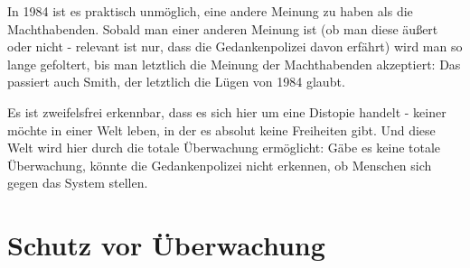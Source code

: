 \documentclass{article}
\begin{document}
In 1984 ist es praktisch unmöglich, eine andere Meinung zu haben als die Machthabenden. Sobald man einer anderen Meinung ist (ob man diese äußert oder nicht - relevant ist nur, dass die Gedankenpolizei davon erfährt) wird man so lange gefoltert, bis man letztlich die Meinung der Machthabenden akzeptiert: Das passiert auch Smith, der letztlich die Lügen von 1984 glaubt.

Es ist zweifelsfrei erkennbar, dass es sich hier um eine Distopie handelt - keiner möchte in einer Welt leben, in der es absolut keine Freiheiten gibt. Und diese Welt wird hier durch die totale Überwachung ermöglicht: Gäbe es keine totale Überwachung, könnte die Gedankenpolizei nicht erkennen, ob Menschen sich gegen das System stellen.


\section{Schutz vor Überwachung}
\label{sec:Schutz vor Ueberwachung}

\newpage
\printbibliography
\end{document}
